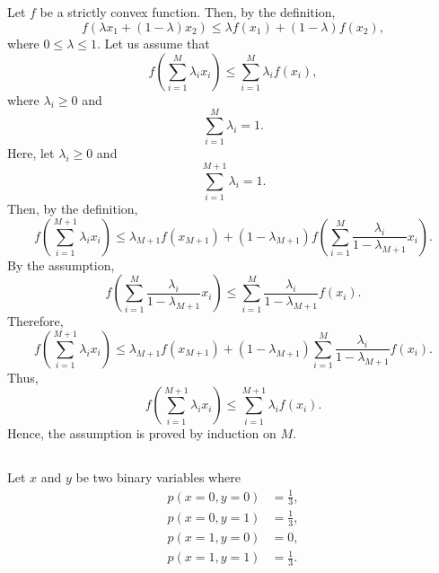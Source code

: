 \subsection{}
Let $f$ be a strictly convex function.
Then, by the definition,
%
\begin{equation}
f \left( \lambda x_1 + (1 - \lambda) x_2 \right) \leq \lambda f(x_1) + (1 - \lambda) f(x_2),
\end{equation}
%
where $0 \leq \lambda \leq 1$.
Let us assume that 
%
\begin{equation}
f \left( \sum_{i = 1}^{M} \lambda_i x_i \right) \leq \sum_{i = 1}^{M} \lambda_i f(x_i),
\end{equation}
%
where $\lambda_i \geq 0$ and
%
\begin{equation}
\sum_{i = 1}^{M} \lambda_i = 1.
\end{equation}
%
Here, let $\lambda_i \geq 0$ and
%
\begin{equation}
\sum_{i = 1}^{M + 1} \lambda_i = 1.
\end{equation}
%
Then, by the definition,
%
\begin{equation}
f \left( \sum_{i = 1}^{M + 1} \lambda_i x_i \right) \leq \lambda_{M + 1} f ( x_{M + 1} ) + (1 - \lambda_{M + 1}) f \left( \sum_{i = 1}^{M} \frac{\lambda_i}{1 - \lambda_{M + 1}} x_i \right).
\end{equation}
%
By the assumption,
%
\begin{equation}
f \left( \sum_{i = 1}^{M} \frac{\lambda_i}{1 - \lambda_{M + 1}} x_i \right) \leq \sum_{i = 1}^{M} \frac{\lambda_i}{1 - \lambda_{M + 1}} f(x_i).
\end{equation}
%
Therefore,
%
\begin{equation}
f \left( \sum_{i = 1}^{M + 1} \lambda_i x_i \right) \leq \lambda_{M + 1} f ( x_{M + 1} ) + (1 - \lambda_{M + 1}) \sum_{i = 1}^{M} \frac{\lambda_i}{1 - \lambda_{M + 1}} f(x_i).
\end{equation}
%
Thus,
%
\begin{equation}
f \left( \sum_{i = 1}^{M + 1} \lambda_i x_i \right) \leq \sum_{i = 1}^{M + 1} \lambda_i f(x_i).
\end{equation}
%
Hence, the assumption is proved by induction on $M$.


\subsection{}
Let $x$ and $y$ be two binary variables where
%
\begin{equation}
\begin{aligned}
p(x = 0, y = 0) &= \frac{1}{3}, \\
p(x = 0, y = 1) &= \frac{1}{3}, \\
p(x = 1, y = 0) &= 0, \\
p(x = 1, y = 1) &= \frac{1}{3}.
\end{aligned}
\end{equation}
%



